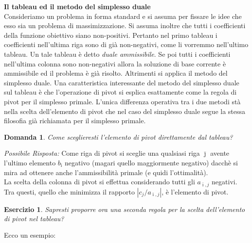 \documentclass[10pt]{article}
\newtheorem{Dom}{Domanda}%
\newtheorem{Ese}{Esercizio}%
\begin{document}
\bigskip

{\large \bf Il tableau ed il metodo del simplesso duale}\\


Consideriamo un problema in forma standard
e si assuma per fissare le idee che esso sia
un problema di massimizzazione.
Si assuma inoltre che tutti i coefficienti della funzione obiettivo
siano non-positivi.
Pertanto nel primo tableau i coefficienti nell'ultima riga
sono di gi\`a non-negativi, come li vorremmo nell'ultimo tableau.
Un tale tableau \`e detto {\em duale ammissibile}.
Se poi tutti i coefficienti nell'ultima colonna sono
non-negativi allora la soluzione di base corrente
\`e ammissibile ed il problema \`e gi\`a risolto.
Altrimenti si applica il metodo del simplesso
duale.
Una caratteristica interessante del metodo del
simplesso duale sul tableau \`e che l'operazione di
pivot si esplica esattamente come la regola di pivot
per il simplesso primale.
L'unica differenza operativa tra i due metodi
st\`a nella scelta dell'elemento di pivot
che nel caso del simplesso duale segue
la stessa filosofia gi\`a richiamata
per il simplesso primale.

\begin{Dom}
   Come sceglieresti l'elemento di pivot direttamente dal tableau?
\end{Dom}
{\em Possibile Risposta: \/}
Come riga di pivot si sceglie
una qualsiasi riga $\bar{\jmath}$
avente l'ultimo elemento $b_{\bar{\imath}}$
negativo (magari quello maggiormente negativo)
dacch\`e si mira ad ottenere anche l'ammissibilit\`a primale
(e quidi l'ottimalit\`a).\\

La scelta della colonna di pivot si effettua
considerando tutti gli $a_{\bar{\imath},j}$ negativi.
Tra questi, quello che minimizza il rapporto 
$|c_j/a_{\bar{\imath},j}|$,
\`e l'elemento di pivot.\\ 

\begin{Ese}
   Sapresti proporre ora una seconda regola per
   la scelta dell'elemento di pivot nel tableau?
\end{Ese}



Ecco un esempio:
\end{document}
